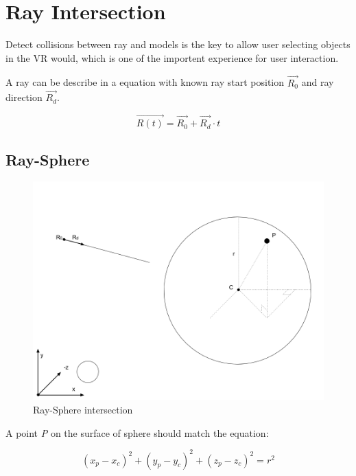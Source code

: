 \section{Ray Intersection}

Detect collisions between ray and models is the key to allow user selecting objects in the VR would, which is one of the importent experience for user interaction.

A ray can be describe in a equation with known ray start position \emph{$\overrightarrow{R_0}$} and ray direction \emph{$\overrightarrow{R_d}$}.

\begin{equation}
\label{equ:ray-t}
\overrightarrow{R(t)} = \overrightarrow{R_0} + \overrightarrow{R_d} \cdot t
\end{equation}

\subsection{Ray-Sphere}

\begin{figure}[H]
\caption[ray-sphere-intersection]{Ray-Sphere intersection}
\label{fig:ray-sphere}
\centering
\includegraphics[width=\linewidth]{Figures/ray-sphere-intersection.png}
\decoRule
\end{figure}

A point \emph{P} on the surface of sphere should match the equation:

\begin{equation}
\label{equ:sphere-surface}
(x_p - x_c)^2 + (y_p - y_c)^2 + (z_p - z_c)^2 = r^2
\end{equation}

